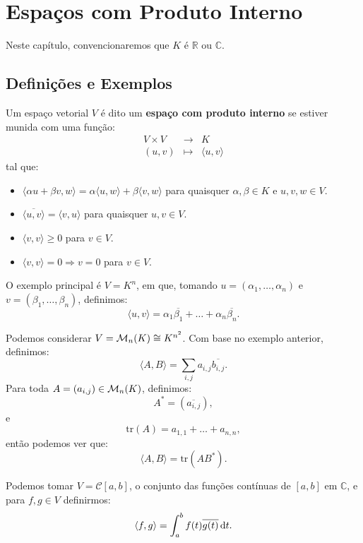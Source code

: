 \documentclass[11pt,twoside,a4paper]{book}
\begin{document}
\chapter{Espaços com Produto Interno}

Neste capítulo, convencionaremos que $K$ é $\mathbb{R}$ ou $\mathbb{C}$.

\section{Definições e Exemplos}

\begin{definicao}
Um espaço vetorial $V$ é dito um \textbf{espaço com produto interno} se estiver munida com uma função:
\[
\begin{array}{rcl}
V\times V&\rightarrow&K\\
(u,v)&\mapsto&\langle u,v\rangle
\end{array}
\]
tal que:
\begin{itemize}
\item $\langle\alpha u+\beta v,w\rangle=\alpha\langle u,w\rangle+\beta\langle v,w\rangle$ para quaisquer $\alpha,\beta\in K$ e $u,v,w\in V$.
\item $\overline{\langle u,v\rangle}=\langle v,u\rangle$ para quaisquer $u,v\in V$.
\item $\langle v,v\rangle\geq 0$ para $v\in V$.
\item $\langle v,v\rangle=0\Rightarrow v=0$ para $v\in V$.
\end{itemize}
\end{definicao}

\begin{exemplo}
O exemplo principal é $V=K^n$, em que, tomando $u=(\alpha_1,\dots,\alpha_n)$ e $v=(\beta_1,\dots,\beta_n)$, definimos:
\[
\langle u,v\rangle=\alpha_1\overline{\beta_1}+\dots+\alpha_n\overline{\beta_n}.
\]
\end{exemplo}

\begin{exemplo}
Podemos considerar $V=\mathcal{M}_{n}(K)\cong K^{n^2}$. Com base no exemplo anterior, definimos:
\[
\langle A,B\rangle=\sum_{i,j}a_{i,j}\overline{b_{i,j}}.
\]
Para toda $A=(a_{i,j})\in\mathcal{M}_{n}(K)$, definimos:
\[
A^*=(\overline{a_{i,j}}),
\]
e
\[
\mathrm{tr}(A)=a_{1,1}+\dots+a_{n,n},
\]
então podemos ver que:
\[
\langle A,B\rangle=\mathrm{tr}(AB^*).
\]
\end{exemplo}

\begin{exemplo}
Podemos tomar $V=\mathcal{C}[a,b]$, o conjunto das funções contínuas de $[a,b]$ em $\mathbb{C}$, e para $f,g\in V$ definirmos:
\[
\langle f,g\rangle=\int_a^bf(t)\overline{g(t)}\dif t.
\]
\end{exemplo}
\end{document}
